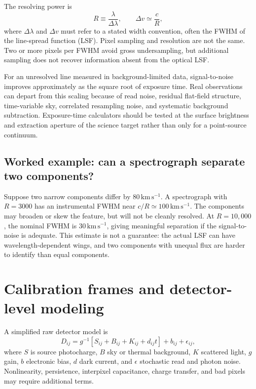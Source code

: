 The resolving power is
\begin{equation}
 R\equiv\frac{\lambda}{\Delta\lambda},
 \qquad \Delta v\simeq\frac{c}{R},
 \label{eq:resolving-power}
\end{equation}
where $\Delta\lambda$ and $\Delta v$ must refer to a stated width convention, often
the FWHM of the line-spread function (LSF).  Pixel sampling and resolution are not the
same.  Two or more pixels per FWHM avoid gross undersampling, but additional sampling
does not recover information absent from the optical LSF.

For an unresolved line measured in background-limited data, signal-to-noise improves
approximately as the square root of exposure time.  Real observations can depart from
this scaling because of read noise, residual flat-field structure, time-variable sky,
correlated resampling noise, and systematic background subtraction.  Exposure-time
calculators should be tested at the surface brightness and extraction aperture of the
science target rather than only for a point-source continuum.

\subsection{Worked example: can a spectrograph separate two components?}

Suppose two narrow components differ by $80\,\mathrm{km\,s^{-1}}$.  A spectrograph
with $R=3000$ has an instrumental FWHM near $c/R\simeq100\,\mathrm{km\,s^{-1}}$.
The components may broaden or skew the feature, but will not be cleanly resolved.
At $R=10{,}000$, the nominal FWHM is $30\,\mathrm{km\,s^{-1}}$, giving meaningful
separation if the signal-to-noise is adequate.  This estimate is not a guarantee:
the actual LSF can have wavelength-dependent wings, and two components with unequal
flux are harder to identify than equal components.

\section{Calibration frames and detector-level modeling}

A simplified raw detector model is
\begin{equation}
 D_{ij}=g^{-1}\left[S_{ij}+B_{ij}+K_{ij}+d_{ij}t\right]
 +b_{ij}+\epsilon_{ij},
 \label{eq:detector-model}
\end{equation}
where $S$ is source photocharge, $B$ sky or thermal background, $K$ scattered light,
$g$ gain, $b$ electronic bias, $d$ dark current, and $\epsilon$ stochastic read and
photon noise.  Nonlinearity, persistence, interpixel capacitance, charge transfer,
and bad pixels may require additional terms.


